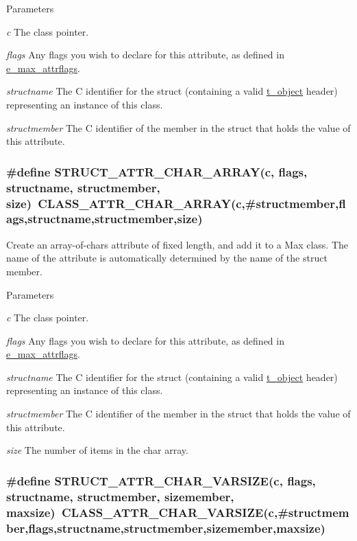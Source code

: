 \begin{DoxyParams}{Parameters}
\item[{\em c}]The class pointer. \item[{\em flags}]Any flags you wish to declare for this attribute, as defined in \hyperlink{group__attr_gaf296cfc6741bb19207f6ed8062809115}{e\_\-max\_\-attrflags}. \item[{\em structname}]The C identifier for the struct (containing a valid \hyperlink{structt__object}{t\_\-object} header) representing an instance of this class. \item[{\em structmember}]The C identifier of the member in the struct that holds the value of this attribute. \end{DoxyParams}
\hypertarget{group__attr_ga802ed4199e77e397d1fd6fba07787b71}{
\subsubsection[{STRUCT\_\-ATTR\_\-CHAR\_\-ARRAY}]{\setlength{\rightskip}{0pt plus 5cm}\#define STRUCT\_\-ATTR\_\-CHAR\_\-ARRAY(c, \/  flags, \/  structname, \/  structmember, \/  size)~CLASS\_\-ATTR\_\-CHAR\_\-ARRAY(c,\#structmember,flags,structname,structmember,size)}}
\label{group__attr_ga802ed4199e77e397d1fd6fba07787b71}


Create an array-\/of-\/chars attribute of fixed length, and add it to a Max class. The name of the attribute is automatically determined by the name of the struct member.


\begin{DoxyParams}{Parameters}
\item[{\em c}]The class pointer. \item[{\em flags}]Any flags you wish to declare for this attribute, as defined in \hyperlink{group__attr_gaf296cfc6741bb19207f6ed8062809115}{e\_\-max\_\-attrflags}. \item[{\em structname}]The C identifier for the struct (containing a valid \hyperlink{structt__object}{t\_\-object} header) representing an instance of this class. \item[{\em structmember}]The C identifier of the member in the struct that holds the value of this attribute. \item[{\em size}]The number of items in the char array. \end{DoxyParams}
\hypertarget{group__attr_ga05138020c20f81f1ff97bc429906231e}{
\subsubsection[{STRUCT\_\-ATTR\_\-CHAR\_\-VARSIZE}]{\setlength{\rightskip}{0pt plus 5cm}\#define STRUCT\_\-ATTR\_\-CHAR\_\-VARSIZE(c, \/  flags, \/  structname, \/  structmember, \/  sizemember, \/  maxsize)~CLASS\_\-ATTR\_\-CHAR\_\-VARSIZE(c,\#structmember,flags,structname,structmember,sizemember,maxsize)}}
\label{group__attr_ga05138020c20f81f1ff97bc429906231e}


